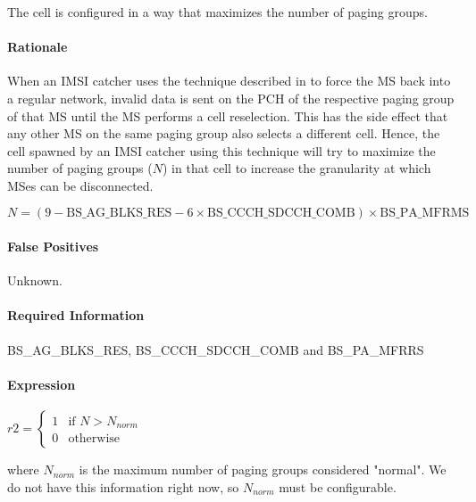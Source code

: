 \documentclass[a4paper,11pt,notitlepage,bigheadings,oneside]{scrartcl}
\begin{document}
\subsubsection{}

The cell is configured in a way that maximizes the number of paging groups.

\paragraph{Rationale}

When an IMSI catcher uses the technique described in
\cite[0021]{bott2000verfahren} to force the MS back into a regular network,
invalid data is sent on the PCH of the respective paging group of that MS until
the MS performs a cell reselection. This has the side effect that any other MS
on the same paging group also selects a different cell. Hence, the cell spawned
by an IMSI catcher using this technique will try to maximize the number of
paging groups ($N$) in that cell to increase the granularity at which MSes can
be disconnected.

${N} = (9 - {\text{BS\_AG\_BLKS\_RES}} - 6\times {\text{BS\_CCCH\_SDCCH\_COMB}})\times {\text{BS\_PA\_MFRMS}}$

\paragraph{False Positives}

Unknown.

\paragraph{Required Information}

BS\_AG\_BLKS\_RES, BS\_CCCH\_SDCCH\_COMB and BS\_PA\_MFRRS

\paragraph{Expression}

$r2 =
\begin{cases}
	1 & \text{if } N > N_{norm} \\
        0 & \text{otherwise}
        \end{cases}
$

where $N_{norm}$ is the maximum number of paging groups considered "normal". We
do not have this information right now, so $N_{norm}$ must be configurable.
\end{document}
